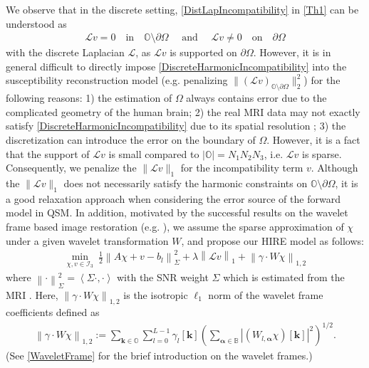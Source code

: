 \documentclass[reqno]{siamonline1116}
\numberwithin{theorem}{section}
\numberwithin{equation}{section}
\def\BB{{\mathbb B}}
\def\OO{{\mathbb O}}
\def\Om{\Omega}
\def\f{\frac}
\def\p{\partial}
\def\la{\langle}
\def\ra{\rangle}
\def\bk{{\boldsymbol k}}
\def\mI{{\mathcal I}}
\def\msL{{\mathscr L}}
\def\aal{\boldsymbol{\alpha}}
\def\la{\langle}
\def\ra{\rangle}
\begin{document}
We observe that in the discrete setting, \cref{DistLapIncompatibility} in \cref{Th1} can be understood as
\begin{align}\label{DiscreteHarmonicIncompatibility}
\msL v=0\quad\text{in}\quad\OO\setminus\p\Om\quad\text{ and }\quad \msL v\neq0\quad\text{on}\quad\p\Om
\end{align}
with the discrete Laplacian $\msL$, as $\msL v$ is supported on $\p\Om$. However, it is in general difficult to directly impose \cref{DiscreteHarmonicIncompatibility} into the susceptibility reconstruction model (e.g. penalizing $\|(\msL v)_{\OO\setminus\p\Om}\|_2^2$) for the following reasons: 1) the estimation of $\Om$ always contains error due to the complicated geometry of the human brain; 2) the real MRI data may not exactly satisfy \cref{DiscreteHarmonicIncompatibility} due to its spatial resolution \cite{E.M.Haacke1999}; 3) the discretization can introduce the error on the boundary of $\Om$. However, it is a fact that the support of $\msL v$ is small compared to $|\OO|=N_1N_2N_3$, i.e. $\msL v$ is sparse. Consequently, we penalize the $\|\msL v\|_1$ for the incompatibility term $v$. Although the $\|\msL v\|_1$ does not necessarily satisfy the harmonic constraints on $\OO\setminus\p\Om$, it is a good relaxation approach when considering the error source of the forward model in QSM. In addition, motivated by the successful results on the wavelet frame based image restoration (e.g. \cite{J.F.Cai2010,J.F.Cai2012}), we assume the sparse approximation of $\chi$ under a given wavelet transformation $W$, and propose our HIRE model as follows:
\begin{align}\label{WaveletFrameHIRE}
\min_{\chi,v\in\mI_3}~\f{1}{2}\left\|A\chi+v-b_l\right\|_{\Sigma}^2+\lambda\left\|\msL v\right\|_1+\left\|\gamma\cdot W\chi\right\|_{1,2}
\end{align}
where $\left\|\cdot\right\|_{\Sigma}^2=\left\la\Sigma\cdot,\cdot\right\ra$ with the SNR weight $\Sigma$ which is estimated from the MRI \cite{T.Liu2011a,C.Milovic2018}. Here, $\left\|\gamma\cdot W\chi\right\|_{1,2}$ is the isotropic $\ell_1$ norm of the wavelet frame coefficients \cite{J.F.Cai2012} defined as
\begin{align}\label{IsoTropicWaveletFrame}
\left\|\gamma\cdot W\chi\right\|_{1,2}:=\sum_{\bk\in\OO}\sum_{l=0}^{L-1}\gamma_l[\bk]\left(\sum_{\aal\in\BB}\left|\left(W_{l,\aal}\chi\right)[\bk]\right|^2\right)^{1/2}.
\end{align}
(See \cref{WaveletFrame} for the brief introduction on the wavelet frames.)
\end{document}
